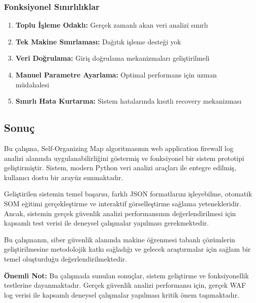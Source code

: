 \subsubsection{Fonksiyonel Sınırlılıklar}

\begin{enumerate}
    \item \textbf{Toplu İşleme Odaklı:} Gerçek zamanlı akan veri analizi sınırlı
    
    \item \textbf{Tek Makine Sınırlaması:} Dağıtık işleme desteği yok
    
    \item \textbf{Veri Doğrulama:} Giriş doğrulama mekanizmaları geliştirilmeli
    
    \item \textbf{Manuel Parametre Ayarlama:} Optimal performans için uzman müdahalesi
    
    \item \textbf{Sınırlı Hata Kurtarma:} Sistem hatalarında kısıtlı recovery mekanizması
\end{enumerate}

\subsection{Sonuç}

Bu çalışma, Self-Organizing Map algoritmasının web application firewall log analizi alanında uygulanabilirliğini göstermiş ve fonksiyonel bir sistem prototipi geliştirmiştir. Sistem, modern Python veri analizi araçları ile entegre edilmiş, kullanıcı dostu bir arayüz sunmaktadır.

Geliştirilen sistemin temel başarısı, farklı JSON formatlarını işleyebilme, otomatik SOM eğitimi gerçekleştirme ve interaktif görselleştirme sağlama yetenekleridir. Ancak, sistemin gerçek güvenlik analizi performansının değerlendirilmesi için kapsamlı test verisi ile deneysel çalışmalar yapılması gerekmektedir.

Bu çalışmanın, siber güvenlik alanında makine öğrenmesi tabanlı çözümlerin geliştirilmesine metodolojik katkı sağladığı ve gelecek araştırmalar için sağlam bir temel oluşturduğu değerlendirilmektedir.

\textbf{Önemli Not:} Bu çalışmada sunulan sonuçlar, sistem geliştirme ve fonksiyonellik testlerine dayanmaktadır. Gerçek güvenlik analizi performansı için, gerçek WAF log verisi ile kapsamlı deneysel çalışmalar yapılması kritik önem taşımaktadır.



